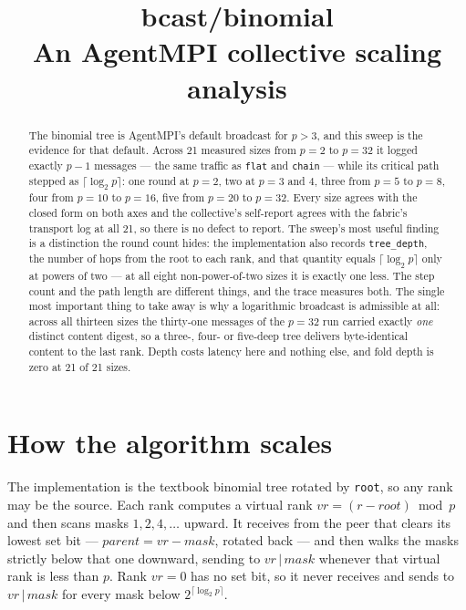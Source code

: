 \documentclass[11pt]{article}
\title{\textbf{bcast/binomial}\\[2pt]\large An AgentMPI collective scaling analysis}
\author{}
\date{}
\begin{document}
\maketitle

\begin{abstract}
The binomial tree is AgentMPI's default broadcast for $p>3$, and this sweep is the evidence
for that default. Across 21 measured sizes from $p=2$ to $p=32$ it logged exactly $p-1$
messages --- the same traffic as \texttt{flat} and \texttt{chain} --- while its critical path
stepped as $\lceil \log_2 p \rceil$: one round at $p=2$, two at $p=3$ and $4$, three from
$p=5$ to $p=8$, four from $p=10$ to $p=16$, five from $p=20$ to $p=32$. Every size agrees
with the closed form on both axes and the collective's self-report agrees with the fabric's
transport log at all 21, so there is no defect to report. The sweep's most useful finding is a
distinction the round count hides: the implementation also records \texttt{tree\_depth}, the
number of hops from the root to each rank, and that quantity equals $\lceil\log_2 p\rceil$
only at powers of two --- at all eight non-power-of-two sizes it is exactly one less. The
step count and the path length are different things, and the trace measures both. The single
most important thing to take away is why a logarithmic broadcast is admissible at all: across
all thirteen sizes the thirty-one messages of the $p=32$ run carried exactly \emph{one}
distinct content digest, so a three-, four- or five-deep tree delivers byte-identical content
to the last rank. Depth costs latency here and nothing else, and fold depth is zero at 21 of
21 sizes.
\end{abstract}



\section{How the algorithm scales}

The implementation is the textbook binomial tree rotated by \texttt{root}, so any rank may be
the source. Each rank computes a virtual rank $vr = (r - \mathit{root}) \bmod p$ and then scans
masks $1, 2, 4, \dots$ upward. It receives from the peer that clears its lowest set bit ---
$\mathit{parent} = vr - \mathit{mask}$, rotated back --- and then walks the masks strictly
below that one downward, sending to $vr\,|\,\mathit{mask}$ whenever that virtual rank is less
than $p$. Rank $vr=0$ has no set bit, so it never receives and sends to $vr\,|\,\mathit{mask}$
for every mask below $2^{\lceil\log_2 p\rceil}$.
\end{document}
